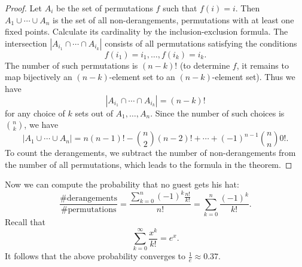 

\setcounter{section}{5}
\setcounter{subsection}{3}
\setcounter{dfn}{3}

\begin{proof}
Let $A_i$ be the set of permutations $f$ such that $f(i) = i$.
Then $A_1 \cup \cdots \cup A_n$ is the set of all non-derangements, permutations with at least one fixed points.
Calculate its cardinality by the inclusion-exclusion formula.
The intersection $|A_{i_1} \cap \cdots \cap A_{i_k}|$ consists of all permutations satisfying the conditions
\[
f(i_1) = i_1, \ldots, f(i_k) = i_k.
\]
The number of such permutations is $(n-k)!$
(to determine $f$, it remains to map bijectively an $(n-k)$-element set to an $(n-k)$-element set).
Thus we have
\[
|A_{i_1} \cap \cdots \cap A_{i_k}| = (n-k)!
\]
for any choice of $k$ sets out of $A_1, \ldots, A_n$.
Since the number of such choices is $\binom{n}{k}$, we have
\[
|A_1 \cup \cdots \cup A_n| = n (n-1)! - \binom{n}{2} (n-2)! + \cdots + (-1)^{n-1} \binom{n}{n} 0!.
\]
To count the derangements, we subtract the number of non-derangements from the number of all permutations,
which leads to the formula in the theorem.
\end{proof}

Now we can compute the probability that no guest gets his hat:
\[
\frac{\#\text{derangements}}{\#\text{permutations}} = \frac{\sum_{k=0}^n (-1)^k \frac{n!}{k!}}{n!} = \sum_{k=0}^n \frac{(-1)^k}{k!}.
\]
Recall that
\[
\sum_{k=0}^\infty \frac{x^k}{k!} = e^x.
\]
It follows that the above probability converges to $\frac{1}{e} \approx 0.37$.



